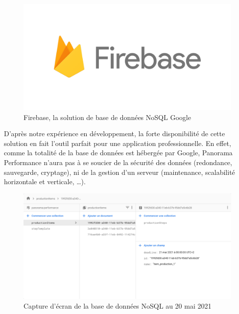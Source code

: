 \begin{figure}[h!]
    \centering
\includegraphics[scale=0.15]{img/firebase.png}
    \caption{Firebase, la solution de base de données NoSQL Google}
    \label{fig:Firebase Logo}
\end{figure}

D'après notre expérience en développement, la forte disponibilité de cette solution en fait l'outil parfait pour une application professionnelle. En effet, comme la totalité de la base de données est hébergée par Google, Panorama Performance n'aura pas à se soucier de la sécurité des données (redondance, sauvegarde, cryptage), ni de la gestion d'un serveur (maintenance, scalabilité horizontale et verticale, \dots).\\

\begin{figure}[!h]
    \centering
    \includegraphics[scale=0.2]{img/screen_firebase.png}
    \caption{Capture d'écran de la base de données NoSQL au 20 mai 2021}
    \label{fig:CaptureFirebase}
\end{figure}

